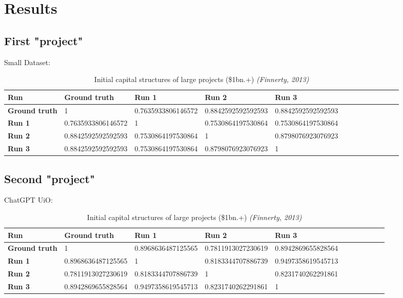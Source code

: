 \section*{Results}
\subsection*{First "project"}
Small Dataset:
\begin{table}[h]
    \centering
        \begin{tabular}{@{}lllllllllllll@{}}\toprule        %
            \textbf{Run}  & \textbf{Ground truth} & \textbf{Run 1} & \textbf{Run 2} & \textbf{Run 3}\\ 
            \midrule
            \textbf{Ground truth} & 1  & 0.7635933806146572 & 0.8842592592592593 & 0.8842592592592593\\
            \hdashline
            \textbf{Run 1} & 0.7635933806146572 & 1 & 0.7530864197530864 & 0.7530864197530864\\
            \hdashline
            \textbf{Run 2} & 0.8842592592592593 & 0.7530864197530864 & 1 & 0.8798076923076923\\
            \hdashline
            \textbf{Run 3} & 0.8842592592592593 & 0.7530864197530864 & 0.8798076923076923 & 1\\
            \bottomrule
        \end{tabular}
    \caption{Initial capital structures of large projects (\$1bn.+) \emph{(Finnerty, 2013)}}
\end{table}

\subsection*{Second "project"}

ChatGPT UiO:
\begin{table}[h]            %
    \centering
    \begin{tabular}{@{}lllllllllll@{}}\toprule
        \textbf{Run}  & \textbf{Ground truth} & \textbf{Run 1} & \textbf{Run 2} & \textbf{Run 3}\\ 
        \midrule
        \textbf{Ground truth} & \cellcolor[HTML]{FFFFFF} 1  & 0.8968636487125565 & 0.7811913027230619 & 0.8942869655828564\\
        \hdashline
        \textbf{Run 1} & 0.8968636487125565 & 1 & 0.8183344707886739 & 0.9497358619545713\\
        \hdashline
        \textbf{Run 2} & 0.7811913027230619 & 0.8183344707886739 & 1 & 0.8231740262291861\\
        \hdashline
        \textbf{Run 3} & 0.8942869655828564 & 0.9497358619545713 & 0.8231740262291861 & 1\\
        \bottomrule
    \end{tabular}
    \caption{Initial capital structures of large projects (\$1bn.+) \emph{(Finnerty, 2013)}}
\end{table}

